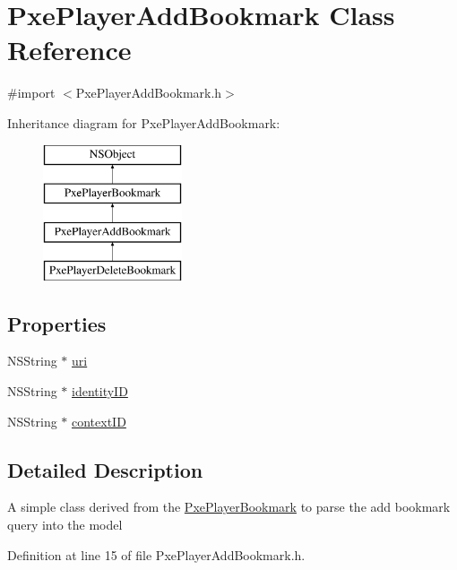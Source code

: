 \hypertarget{interface_pxe_player_add_bookmark}{\section{Pxe\-Player\-Add\-Bookmark Class Reference}
\label{interface_pxe_player_add_bookmark}
}


{\ttfamily \#import $<$Pxe\-Player\-Add\-Bookmark.\-h$>$}

Inheritance diagram for Pxe\-Player\-Add\-Bookmark\-:\begin{figure}[H]
\begin{center}
\leavevmode
\includegraphics[height=4.000000cm]{interface_pxe_player_add_bookmark}
\end{center}
\end{figure}
\subsection*{Properties}
\begin{DoxyCompactItemize}
\item 
N\-S\-String $\ast$ \hyperlink{interface_pxe_player_add_bookmark_a892615c32c37e6c4a5a978fc0898de2f}{uri}
\item 
N\-S\-String $\ast$ \hyperlink{interface_pxe_player_add_bookmark_a43618fee5cf82e2461f50948277e5f1a}{identity\-I\-D}
\item 
N\-S\-String $\ast$ \hyperlink{interface_pxe_player_add_bookmark_ad6cd116d2ff48911fa8ecc561072e9b5}{context\-I\-D}
\end{DoxyCompactItemize}


\subsection{Detailed Description}
A simple class derived from the \hyperlink{interface_pxe_player_bookmark}{Pxe\-Player\-Bookmark} to parse the add bookmark query into the model 

Definition at line 15 of file Pxe\-Player\-Add\-Bookmark.\-h.



